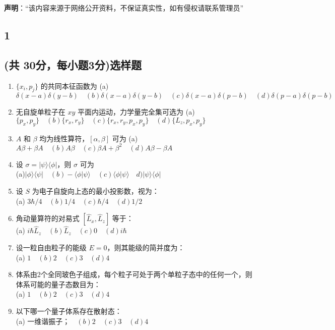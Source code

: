 
\textbf{声明}：“该内容来源于网络公开资料，不保证真实性，如有侵权请联系管理员”

\subsection{1}
\subsection{(共 30分，每小题3分)选样题}
\begin{enumerate}
    \item $\{x_i, p_j\}$ 的共同本征函数为 
(a) $\delta(x-a)\delta(y-b)\quad  (b) \delta(x-a)\delta(y-b) \quad (c) \delta(x-a)\delta(p-b) \quad (d) \delta(p-a)\delta(p-b)$
    \item 无自旋单粒子在 $xy$ 平面内运动，力学量完全集可选为 
(a) $\{p_x, p_y\} \quad (b) \{r_x, r_y\}\quad (c) \{r_x, r_y, p_x, p_y\}\quad (d) \{L_z, p_x, p_y\}$
    \item $A$ 和 $\beta$ 均为线性算符，$[\alpha, \beta]$ 可为 
(a) $A\beta + \beta A\quad (b) A\beta\quad (c) \beta A + \beta^2\quad (d) A\beta - \beta A$
    \item 设 $\sigma = |\psi\rangle \langle\phi|$，则 $\sigma$ 可为\\ 
(a)$|\phi\rangle \langle\psi| \quad (b) -\langle\phi|\psi\rangle \quad (c) \langle\phi|\psi\rangle\quad d) |\psi\rangle \langle\phi|$
     \item 设 $S$ 为电子自旋向上态的最小投影数，视为：\\
(a) $3\hbar/4 \quad (b) 1/4 \quad  (c) \hbar/4 \quad (d) 1/2 $
     \item 角动量算符的对易式 $[\hat{L}_x, \hat{L}_z]$ 等于：\\
(a) $i\hbar\hat{L}_z \quad (b) \hat{L}_z  \quad  (c) 0 \quad (d) i\hbar $
\item 设一粒自由粒子的能级 $ E = 0$，则其能级的简并度为：\\
(a) $1 \quad (b) 2  \quad  (c) 3 \quad (d) 4 $
\item 体系由2个全同玻色子组成，每个粒子可处于两个单粒子态中的任何一个，则体系可能的量子态数目为：\\
(a) $1 \quad (b) 2  \quad  (c) 3 \quad (d) 4 $
\item 以下哪一个量子体系存在散射态：\\
(a) $ 一维谐振子； \quad (b) 2  \quad  (c) 3 \quad (d) 4 $
\end{enumerate}

